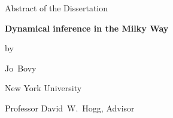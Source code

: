 \documentclass[12pt,letterpaper]{article}
\newcommand{\thesistitle}{Dynamical inference in the Milky Way}
\newcommand{\thesisauthor}{Jo~Bovy}
\newcommand{\thesisadvisor}{Professor David~W.~Hogg}
\begin{document}
  \begin{center}
    Abstract of the Dissertation\bigskip

    \textbf{\thesistitle}\bigskip

    by\bigskip

    \thesisauthor\bigskip

    New York University\bigskip

    \thesisadvisor, Advisor
  \end{center}
\bigskip


\end{document}
